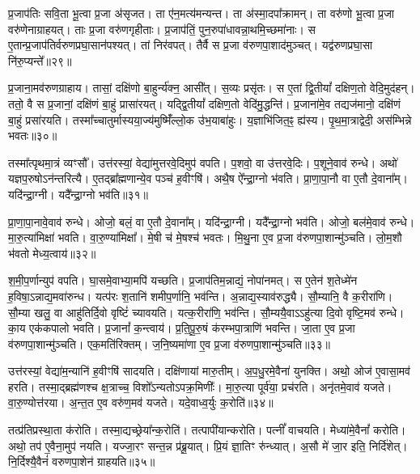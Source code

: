 प्र॒जा\-प॑तिः सवि॒ता भू॒त्वा प्र॒जा अ॑\-सृजत।
ता ए॑न॒मत्य॑मन्यन्त।
ता अ॑स्मा॒दपा᳚क्रामन्।
ता वरु॑णो भू॒त्वा प्र॒जा वरु॑णेनाग्राहयत्।
ताः प्र॒जा वरु॑णगृहीताः।
प्र॒जा\-प॑तिं॒ पुन॒रुपा॑धावन्ना॒थमि॒च्छमा॑नाः।
स ए॒तान्प्र॒जा\-प॑तिर्वरुण\-प्रघा॒सान॑पश्यत्।
तां निर॑वपत्।
तैर्वै स प्र॒जा व॑रुणपा॒शाद॑मुञ्चत्।
यद्व॑रुणप्रघा॒सा नि॑रु॒प्यन्ते᳚॥२९॥\ip

प्र॒जाना॒मव॑रुणग्राहाय।
तासां॒ दक्षि॑णो बा॒हुर्न्य॑क्न॒ आसी᳚त्।
स॒व्यः प्रसृ॑तः।
स ए॒तां द्वि॒तीयां᳚ दक्षिण॒तो वेदि॒मुद॑हन्।
ततो॒ वै स प्र॒जानां॒ दक्षि॑णं बा॒हुं प्रासा॑रयत्।
यद्द्वि॒तीयां᳚ दक्षिण॒तो वेदि॑मु॒द्धन्ति॑।
प्र॒जाना॑मे॒व तद्यज॑मानो॒ दक्षि॑णं बा॒हुं प्रसा॑रयति।
तस्मा᳚च्चातुर्मास्यया॒ज्य॑मुष्मिँ॑ल्लो॒क उ॑भ॒याबा॑हुः।
य॒ज्ञाभि॑जित॒ꣴ॒ ह्य॑स्य।
पृ॒थ॒मा॒त्राद्वेदी॒ अस॑म्भिन्ने भवतः॥३०॥\ip

तस्मा᳚त्पृथमा॒त्रं व्यꣳसौ᳚।
उत्त॑रस्यां॒ वेद्या॑मुत्तरवे॒दिमुप॑ वपति।
प॒शवो॒ वा उ॑त्तरवे॒दिः।
प॒शूने॒वाव॑ रुन्धे।
अथो॑ यज्ञप॒रुषो\-ऽन॑न्तरित्यै।
ए॒तद्ब्रा᳚ह्मणान्ये॒व पञ्च॑ ह॒वीꣳषि॑।
अथै॒ष ऐ᳚न्द्रा॒ग्नो भ॑वति।
प्रा॒णा॒पा॒नौ वा ए॒तौ दे॒वाना᳚म्।
यदि॑न्द्रा॒ग्नी।
यदै᳚न्द्रा॒ग्नो भव॑ति॥३१॥\ip

प्रा॒णा॒पा॒नावे॒वाव॑ रुन्धे।
ओजो॒ बलं॒ वा ए॒तौ दे॒वाना᳚म्।
यदि॑न्द्रा॒ग्नी।
यदै᳚न्द्रा॒ग्नो भव॑ति।
ओजो॒ बल॑मे॒वाव॑ रुन्धे।
मा॒रु॒त्या॑\-मिक्षा॑ भवति।
वा॒रु॒ण्या॑मिक्षा᳚।
मे॒षी च॑ मे॒षश्च॑ भवतः।
मि॒थु॒ना ए॒व प्र॒जा व॑रुणपा॒शान्मु॑ञ्चति।
लो॒म॒शौ भ॑वतो मेध्य॒त्वाय॑॥३२॥\ip

श॒मी॒प॒र्णान्युप॑ वपति।
घा॒समे॒वाभ्या॒मपि॑ यच्छति।
प्र॒जा\-प॑तिम॒न्नाद्यं॒ नोपा॑नमत्।
स ए॒तेन॑ श॒तेध्मे॑न ह॒विषा॒\-ऽन्नाद्य॒मवा॑रुन्ध।
यत्प॑रः श॒तानि॑ शमीप॒र्णानि॒ भव॑न्ति।
अ॒न्नाद्य॒स्या\-व॑\-रुद्ध्यै।
सौ॒म्यानि॒ वै क॒रीरा॑णि।
सौ॒म्या खलु॒ वा आहु॑तिर्दि॒वो वृष्टिं॑ च्यावयति।
यत्क॒रीरा॑णि॒ भव॑न्ति।
सौ॒म्ययै॒वाऽऽहु॑त्या दि॒वो वृष्टि॒मव॑ रुन्धे।
का॒य एक॑कपालो भवति।
प्र॒जानां᳚ क॒न्त्वाय॑।
प्र॒ति॒पू॒रु॒षं क॑रम्भपा॒त्राणि॑ भवन्ति।
जा॒ता ए॒व प्र॒जा व॑रुणपा॒शान्मु॑ञ्चति।
एक॒मति॑रिक्तम्।
ज॒नि॒ष्यमा॑णा ए॒व प्र॒जा व॑रुणपा॒शान्मु॑ञ्चति॥३३॥\ip\anuvakamend[नि॒रु॒प्यन्ते॑ भवतो॒ भव॑ति मेध्य॒त्वाय॑ रुन्धे॒ षट्च॑]

उत्त॑रस्यां॒ वेद्या॑म॒न्यानि॑ ह॒वीꣳषि॑ सादयति।
दक्षि॑णायां मारु॒तीम्।
अ॒प॒धु॒रमे॒वैना॑ युनक्ति।
अथो॒ ओज॑ ए॒वासा॒मव॑ हरति।
तस्मा॒द्ब्रह्म॑णश्च क्ष॒त्राच्च॒ विशो᳚\-ऽन्यतो\-ऽपक्र॒मिणीः᳚।
मा॒रु॒त्या पूर्व॑या॒ प्रच॑रति।
अनृ॑तमे॒वाव॑ यजते।
वा॒रु॒ण्योत्त॑रया।
अ॒न्त॒त ए॒व वरु॑ण॒मव॑ यजते।
यदे॒वाध्व॒र्युः क॒रोति॑॥३४॥\ip

तत्प्र॑तिप्रस्था॒ता क॑रोति।
तस्मा॒द्यच्छ्रेया᳚न्क॒रोति॑।
तत्पापी॑\-यान्करोति।
पत्नीं᳚ वाचयति।
मेध्या॑मे॒वैनां᳚ करोति।
अथो॒ तप॑ ए॒वैना॒मुप॑ नयति।
यज्जा॒रꣳ सन्त॒न्न प्र॑ब्रू॒यात्।
प्रि॒यं ज्ञा॒तिꣳ रु॑न्ध्यात्।
अ॒सौ मे॑ जा॒र इति॒ निर्दि॑शेत्।
नि॒र्दिश्यै॒वैनं॑ वरुणपा॒शेन॑ ग्राहयति॥३५॥\ip

